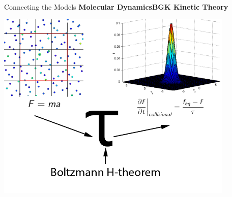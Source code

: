 \documentclass{beamer}
\begin{document}
	\begin{frame}[t]{Connecting the Models}
\hspace{1.75em}\textbf{Molecular Dynamics}\hspace{4.5em}\textbf{BGK Kinetic Theory}
			
		\vspace{0.5em}
		\begin{center}\includegraphics[width=0.85\textwidth]{model_link.png}\end{center}
	\end{frame}
		
\end{document}
